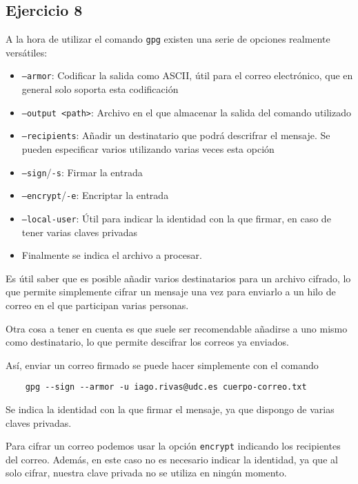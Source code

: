 \subsection{Ejercicio 8}
\graphicspath{ {img/08} }

A la hora de utilizar el comando \texttt{gpg} existen una serie de opciones realmente versátiles:

\begin{itemize}
    \item{\texttt{--armor}: Codificar la salida como ASCII, útil para el correo electrónico, que en general solo soporta esta codificación}
    \item{\texttt{--output <path>}: Archivo en el que almacenar la salida del comando utilizado}
    \item{\texttt{--recipients}: Añadir un destinatario que podrá descrifrar el mensaje. Se pueden especificar varios utilizando varias veces esta opción}
    \item{\texttt{--sign}/\texttt{-s}: Firmar la entrada}
    \item{\texttt{--encrypt}/\texttt{-e}: Encriptar la entrada}
    \item{\texttt{--local-user}: Útil para indicar la identidad con la que firmar, en caso de tener varias claves privadas}
    \item{Finalmente se indica el archivo a procesar.}
\end{itemize}

Es útil saber que es posible añadir varios destinatarios para un archivo cifrado, lo que permite simplemente cifrar un mensaje una vez para enviarlo a un hilo de correo en el que participan varias personas.

Otra cosa a tener en cuenta es que suele ser recomendable añadirse a uno mismo como destinatario, lo que permite descifrar los correos ya enviados.

Así, enviar un correo firmado se puede hacer simplemente con el comando

\begin{verbatim}
    gpg --sign --armor -u iago.rivas@udc.es cuerpo-correo.txt
\end{verbatim}

Se indica la identidad con la que firmar el mensaje, ya que dispongo de varias claves privadas.

Para cifrar un correo podemos usar la opción \texttt{encrypt} indicando los recipientes del correo. Además, en este caso no es necesario indicar la identidad, ya que al solo cifrar, nuestra clave privada no se utiliza en ningún momento.

